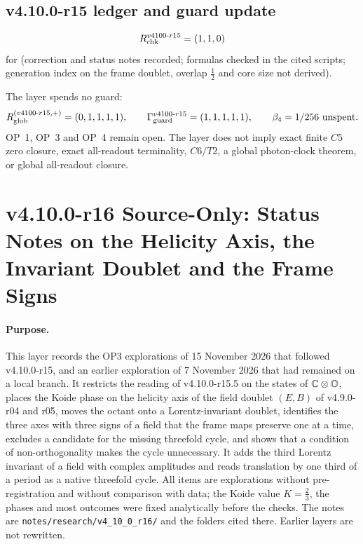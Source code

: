 \subsection*{v4.10.0-r15 ledger and guard update}
\label{subsec:v4100-r15-ledger-guard}

\[
R_{\rm chk}^{v4100\text{-}r15}=(1,1,0)
\]
for (correction and status notes recorded; formulas checked in the cited scripts; generation index on the frame doublet,
overlap \(\tfrac12\) and core size not derived).

The layer spends no guard:
\[
R_{\rm glob}^{(v4100\text{-}r15,+)}=(0,1,1,1,1),
\qquad
\Gamma_{\rm guard}^{v4100\text{-}r15}=(1,1,1,1,1),
\qquad
\beta_4=1/256\ \text{unspent}.
\]
OP~1, OP~3 and OP~4 remain open.  The layer does not imply exact finite \(C5\) zero closure, exact all-readout terminality,
\(C6/T2\), a global photon-clock theorem, or global all-readout closure.

\clearpage
\section*{v4.10.0-r16 Source-Only: Status Notes on the Helicity Axis, the Invariant Doublet and the Frame Signs}
\label{sec:v4100-r16-helicity-invariant-doublet}

\paragraph{Purpose.}
This layer records the OP3 explorations of 15 November 2026 that followed v4.10.0-r15, and an earlier exploration of
7 November 2026 that had remained on a local branch.  It restricts the reading of v4.10.0-r15.5 on the states of
\(\mathbb C\otimes\mathbb{O}\), places the Koide phase on the helicity axis of the field doublet \((E,B)\) of v4.9.0-r04 and r05, moves
the octant onto a Lorentz-invariant doublet, identifies the three axes with three signs of a field that the frame maps
preserve one at a time, excludes a candidate for the missing threefold cycle, and shows that a condition of
non-orthogonality makes the cycle unnecessary.  It adds the third Lorentz invariant of a field with complex amplitudes and
reads translation by one third of a period as a native threefold cycle.  All items are explorations without
pre-registration and without comparison with data; the Koide value \(K=\tfrac23\), the phases and most outcomes were fixed
analytically before the checks.  The notes are \texttt{notes/\allowbreak research/\allowbreak v4\_10\_0\_r16/} and the
folders cited there.  Earlier layers are not rewritten.

